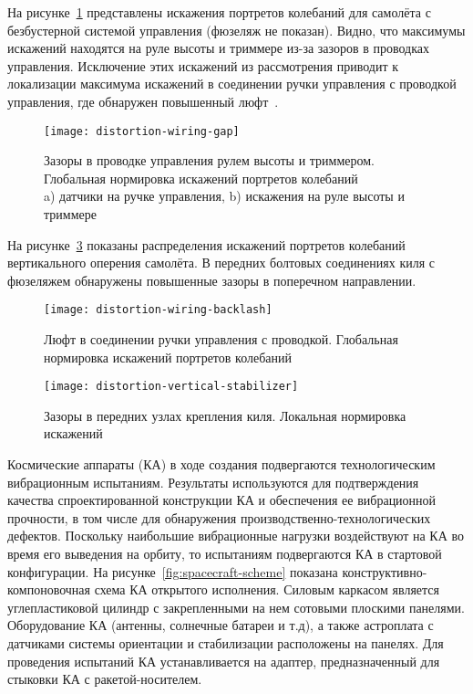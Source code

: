 На рисунке~\ref{fig:distortion-wiring-gap} представлены искажения портретов колебаний для самолёта с безбустерной системой управления (фюзеляж не показан). Видно, что максимумы искажений находятся на руле высоты и триммере из-за зазоров в проводках управления. Исключение этих искажений из рассмотрения приводит к локализации максимума искажений в соединении ручки управления с проводкой управления, где обнаружен повышенный люфт~.

\begin{figure}[!htb]
	\centerfloat
	\texttt{[image: distortion-wiring-gap]}
	\caption{Зазоры в проводке управления рулем высоты и триммером. Глобальная нормировка искажений портретов колебаний \\ a) датчики на ручке управления, b) искажения на руле высоты и триммере} \label{fig:distortion-wiring-gap}
\end{figure}

На рисунке~\ref{fig:distortion-vertical-stabilizer} показаны распределения искажений портретов колебаний вертикального оперения самолёта. В передних болтовых соединениях киля с фюзеляжем обнаружены повышенные зазоры в поперечном направлении. 

\begin{figure}[!htb]
	\centerfloat
	\texttt{[image: distortion-wiring-backlash]}
	\caption{Люфт в соединении ручки управления с проводкой. Глобальная нормировка искажений портретов колебаний} \label{fig:distortion-wiring-backlash}
\end{figure}

\begin{figure}[!htb]
	\centerfloat
	\texttt{[image: distortion-vertical-stabilizer]}
	\caption{Зазоры в передних узлах крепления киля. Локальная нормировка искажений} \label{fig:distortion-vertical-stabilizer}
\end{figure}

Космические аппараты (КА) в ходе создания подвергаются технологическим вибрационным испытаниям. Результаты используются для подтверждения качества спроектированной конструкции КА и обеспечения ее вибрационной прочности, в том числе для обнаружения производственно-технологических дефектов. Поскольку наибольшие вибрационные нагрузки воздействуют на КА во время его выведения на орбиту, то испытаниям подвергаются КА в стартовой конфигурации. На рисунке~\ref{fig:spacecraft-scheme} показана конструктивно-компоновочная схема КА открытого исполнения. Силовым каркасом является углепластиковой цилиндр с закрепленными на нем сотовыми плоскими панелями. Оборудование КА (антенны, солнечные батареи и т.д), а также астроплата с датчиками системы ориентации и стабилизации расположены на панелях. Для проведения испытаний КА устанавливается на адаптер, предназначенный для стыковки КА с ракетой-носителем.


